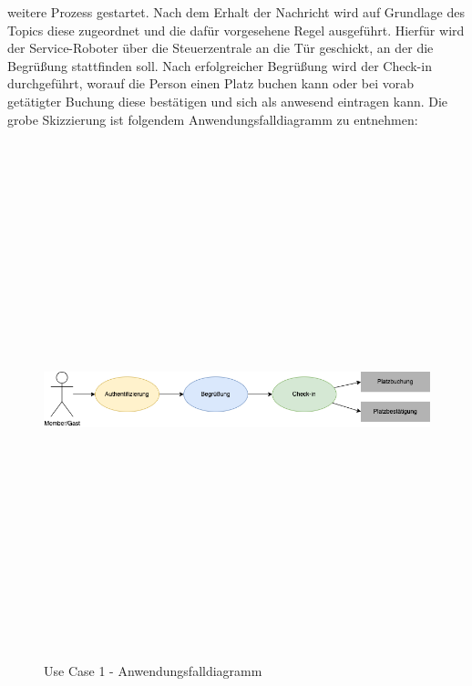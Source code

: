    weitere Prozess gestartet. Nach dem Erhalt der Nachricht wird auf Grundlage des Topics diese zugeordnet und die dafür 
    vorgesehene Regel ausgeführt. Hierfür wird der Service-Roboter über die Steuerzentrale an die Tür geschickt, an der die Begrüßung 
    stattfinden soll. Nach erfolgreicher Begrüßung wird der Check-in durchgeführt, worauf die Person einen Platz buchen kann oder bei vorab getätigter 
    Buchung diese bestätigen und sich als anwesend eintragen kann. Die grobe Skizzierung ist folgendem Anwendungsfalldiagramm zu entnehmen: 
    \begin{figure}[hbt!]
        \centering
        \includegraphics[width=15cm,height=15cm,keepaspectratio]{images/UC1_Diagramm_Check-in.png}
        \caption{Use Case 1 - Anwendungsfalldiagramm}
        \label{fig:uc1-check-in}
    \end{figure}
